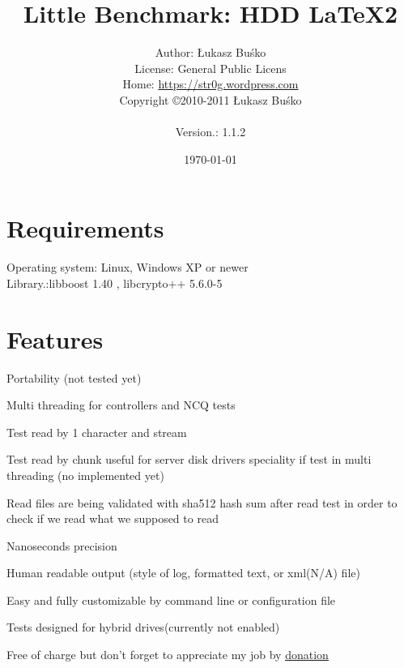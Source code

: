 \documentclass[a4paper]{article}
\begin{document}
\title{Little Benchmark: HDD  \LaTeX2}
\author{Author: Łukasz Buśko
\\License: General Public Licens
\\Home:  \href{https://str0g.wordpress.com}{https://str0g.wordpress.com}
\\Copyright \copyright 2010-2011 Łukasz Buśko\\
\date{\today} Version.: 1.1.2}
\maketitle
\newpage
\tableofcontents
\newpage

\section{Requirements}
Operating system: Linux, Windows XP or newer\\
Library.:libboost 1.40 , libcrypto++ 5.6.0-5
\section{Features}
\begin{itemized}
\item Portability (not tested yet)
\item Multi threading for controllers and NCQ tests
\item Test read by 1 character and stream
\item Test read by chunk useful for server disk drivers speciality if test in multi threading (no implemented yet)
\item Read files are being validated with sha512 hash sum after read test in order to check if we read what we supposed to read
\item Nanoseconds precision
\item Human readable output (style of log, formatted text, or xml(N/A) file)
\item Easy and fully customizable by command line or configuration file
\item Tests designed for hybrid drives(currently not enabled)
\item Free of charge but don't forget to appreciate my job by \href{http://str0g.wordpress.com/about/}{\underline{donation}}
\end{itemized}

\newpage

\newpage


\newpage


\newpages
\end{document}

